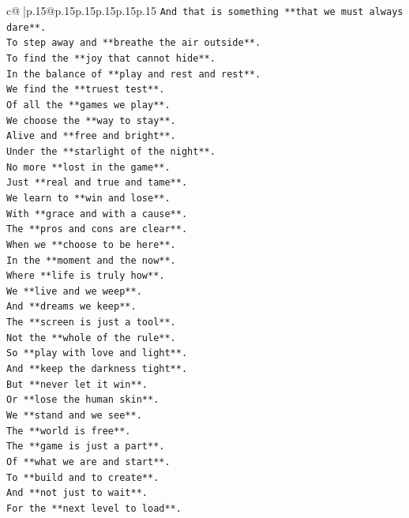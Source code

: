 \documentclass{article}
\begin{document}
{\begin{supertabular}{c@{$\;$}|p{.15\linewidth}@{}p{.15\linewidth}p{.15\linewidth}p{.15\linewidth}p{.15\linewidth}p{.15\linewidth}}
{{{\texttt{And that is something **that we must always dare**.} \\
\texttt{To step away and **breathe the air outside**.} \\
\texttt{To find the **joy that cannot hide**.} \\
\texttt{In the balance of **play and rest and rest**.} \\
\texttt{We find the **truest test**.} \\
\texttt{Of all the **games we play**.} \\
\texttt{We choose the **way to stay**.} \\
\texttt{Alive and **free and bright**.} \\
\texttt{Under the **starlight of the night**.} \\
\texttt{No more **lost in the game**.} \\
\texttt{Just **real and true and tame**.} \\
\texttt{We learn to **win and lose**.} \\
\texttt{With **grace and with a cause**.} \\
\texttt{The **pros and cons are clear**.} \\
\texttt{When we **choose to be here**.} \\
\texttt{In the **moment and the now**.} \\
\texttt{Where **life is truly how**.} \\
\texttt{We **live and we weep**.} \\
\texttt{And **dreams we keep**.} \\
\texttt{The **screen is just a tool**.} \\
\texttt{Not the **whole of the rule**.} \\
\texttt{So **play with love and light**.} \\
\texttt{And **keep the darkness tight**.} \\
\texttt{But **never let it win**.} \\
\texttt{Or **lose the human skin**.} \\
\texttt{We **stand and we see**.} \\
\texttt{The **world is free**.} \\
\texttt{The **game is just a part**.} \\
\texttt{Of **what we are and start**.} \\
\texttt{To **build and to create**.} \\
\texttt{And **not just to wait**.} \\
\texttt{For the **next level to load**.} \\
}}}
\end{supertabular}}
\end{document}
